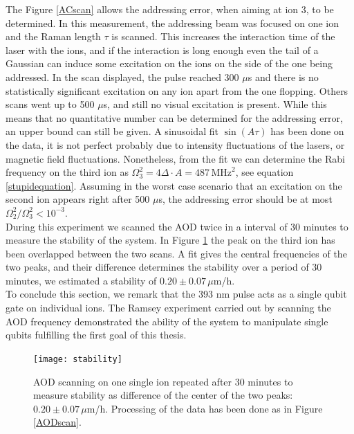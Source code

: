 The Figure \ref{ACscan} allows the addressing error, when aiming at ion 3, to be determined. In this measurement, the addressing beam was focused on one ion and the Raman length $\tau$ is scanned. This increases the interaction time of the laser with the ions, and if the interaction is long enough even the tail of a Gaussian can induce some excitation on the ions on the side of the one being addressed. In the scan displayed, the pulse reached 300 $\mu$s and there is no statistically significant excitation on any ion apart from the one flopping. Others scans went up to 500 $\mu$s, and still no visual excitation is present. While this means that no quantitative number can be determined for the addressing error, an upper bound can still be given. A sinusoidal fit $\sin(A\tau)$ has been done on the data, it is not perfect probably due to intensity fluctuations of the lasers, or magnetic field fluctuations. Nonetheless, from the fit we can determine the Rabi frequency on the third ion as $\Omega_3^2 = 4\Delta \cdot A = 487\,\text{MHz}^2$, see equation \eqref{stupidequation}. Assuming in the worst case scenario that an excitation on the second ion appears right after 500 $\mu$s, the addressing error should be at most $\Omega_2^2/\Omega_3^2< 10^{-3}$.\\
During this experiment we scanned the AOD twice in a interval of 30 minutes to measure the stability of the system. In Figure \ref{fig:stability} the peak on the third ion has been overlapped between the two scans. A fit gives the central frequencies of the two peaks, and their difference determines the stability over a period of 30 minutes, we estimated a stability of $0.20\pm 0.07\,\mu$m/h.\\
To conclude this section, we remark that the 393 nm pulse acts as a single qubit gate on individual ions. The Ramsey experiment carried out by scanning the AOD frequency demonstrated the ability of the system to manipulate single qubits fulfilling the first goal of this thesis.
\begin{figure}
\centering
\texttt{[image: stability]}
\caption{AOD scanning on one single ion repeated after 30 minutes to measure stability as difference of the center of the two peaks: $0.20\pm 0.07\,\mu$m/h. Processing of the data has been done as in Figure \ref{AODscan}.}
\label{fig:stability}
\end{figure}
